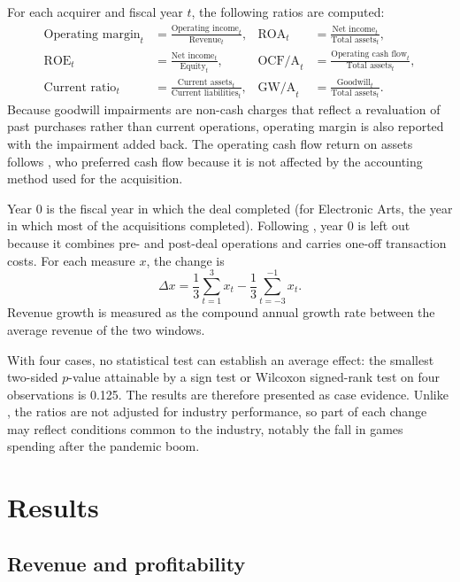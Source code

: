 \documentclass[sn-basic]{sn-jnl}
\begin{document}
For each acquirer and fiscal year $t$, the following ratios are computed:
\begin{align}
\text{Operating margin}_t &= \frac{\text{Operating income}_t}{\text{Revenue}_t}, &
\text{ROA}_t &= \frac{\text{Net income}_t}{\text{Total assets}_t}, \nonumber\\
\text{ROE}_t &= \frac{\text{Net income}_t}{\text{Equity}_t}, &
\text{OCF/A}_t &= \frac{\text{Operating cash flow}_t}{\text{Total assets}_t}, \nonumber\\
\text{Current ratio}_t &= \frac{\text{Current assets}_t}{\text{Current liabilities}_t}, &
\text{GW/A}_t &= \frac{\text{Goodwill}_t}{\text{Total assets}_t}. \label{eq:ratios}
\end{align}
Because goodwill impairments are non-cash charges that reflect a revaluation of past purchases rather than current operations, operating margin is also reported with the impairment added back. The operating cash flow return on assets follows \citet{healy1992}, who preferred cash flow because it is not affected by the accounting method used for the acquisition.

Year 0 is the fiscal year in which the deal completed (for Electronic Arts, the year in which most of the acquisitions completed). Following \citet{healy1992}, year 0 is left out because it combines pre- and post-deal operations and carries one-off transaction costs. For each measure $x$, the change is
\begin{equation}
\Delta x = \frac{1}{3}\sum_{t=1}^{3} x_{t} - \frac{1}{3}\sum_{t=-3}^{-1} x_{t}.\label{eq:change}
\end{equation}
Revenue growth is measured as the compound annual growth rate between the average revenue of the two windows.

With four cases, no statistical test can establish an average effect: the smallest two-sided $p$-value attainable by a sign test or Wilcoxon signed-rank test on four observations is 0.125. The results are therefore presented as case evidence. Unlike \citet{healy1992}, the ratios are not adjusted for industry performance, so part of each change may reflect conditions common to the industry, notably the fall in games spending after the pandemic boom.

\section{Results}\label{sec:results}

\subsection{Revenue and profitability}
\end{document}
